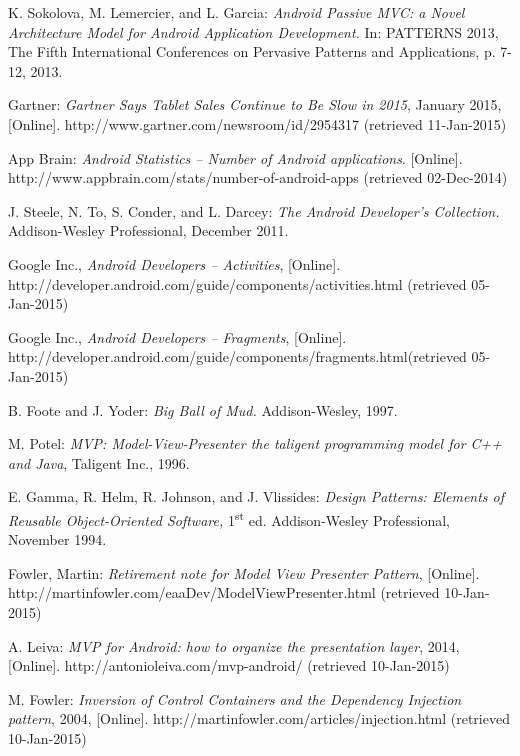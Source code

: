 \begin{thebibliography}{1}

K. Sokolova, M. Lemercier, and L. Garcia: \emph{Android Passive MVC: a Novel Architecture Model for Android Application Development.} In: PATTERNS 2013, The Fifth International Conferences on Pervasive Patterns and Applications, p. 7-12, 2013.

Gartner: \emph{Gartner Says Tablet Sales Continue to Be Slow in 2015}, January 2015, 
[Online]. http://www.gartner.com/newsroom/id/2954317 (retrieved 11-Jan-2015)

App Brain: \emph{Android Statistics -- Number of Android applications}. 
[Online].
http://www.appbrain.com/stats/number-of-android-apps (retrieved 02-Dec-2014)

J. Steele, N. To, S. Conder, and L. Darcey: \emph{The Android Developer's Collection.} Addison-Wesley Professional, December 2011.

Google Inc., \emph{Android Developers -- Activities},
[Online]. http://developer.android.com/guide/components/activities.html (retrieved 05-Jan-2015)

Google Inc., \emph{Android Developers -- Fragments},
[Online]. http://developer.android.com/guide/components/fragments.html(retrieved 05-Jan-2015)

B. Foote and J. Yoder: \emph{Big Ball of Mud.} Addison-Wesley, 1997.

M. Potel: \emph{MVP: Model-View-Presenter the taligent programming model for C++ and Java}, Taligent Inc., 1996.

E. Gamma, R. Helm, R. Johnson, and J. Vlissides: \emph{Design Patterns: Elements of Reusable Object-Oriented Software,} 1\textsuperscript{st} ed. Addison-Wesley Professional, November 1994.

Fowler, Martin: \emph{Retirement note for Model View Presenter Pattern},
[Online]. http://martinfowler.com/eaaDev/ModelViewPresenter.html (retrieved 10-Jan-2015)

A. Leiva: \emph{MVP for Android: how to organize the presentation layer}, 2014,
[Online]. http://antonioleiva.com/mvp-android/ (retrieved 10-Jan-2015)

M. Fowler: \emph{Inversion of Control Containers and the Dependency Injection pattern}, 2004,
[Online]. http://martinfowler.com/articles/injection.html (retrieved 10-Jan-2015)


\end{thebibliography}

